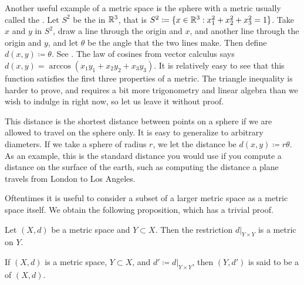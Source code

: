 \begin{example}
Another useful example of a metric space is the sphere
with a metric usually called the \emph{}.
Let $S^2$ be the  in ${\mathbb{R}}^3$,
that is $S^2 \coloneqq \{ x \in {\mathbb{R}}^3 : x_1^2+x_2^2+x_3^2 = 1 \}$.
Take $x$ and $y$ in $S^2$, draw a line through the origin and $x$,
and another line through the origin and $y$,
and let $\theta$ be the angle that the two lines make.
Then define $d(x,y) \coloneqq \theta$.  See .
The law of cosines from vector calculus says
$d(x,y) = \arccos(x_1y_1+x_2y_2+x_3y_3)$.
It is relatively easy to see that this function satisfies the first three
properties of a metric.
The triangle inequality is harder to prove, and requires a bit more
trigonometry and linear algebra than we wish to indulge in right now, so let
us leave it without proof.

\begin{myfigureht}
\caption{The great circle distance on the unit
sphere.\label{fig:spheremetric}}
\end{myfigureht}

This distance is the shortest distance between points on a sphere if
we are allowed to travel on the sphere only.  It is easy to
generalize to arbitrary diameters.  If we take a sphere of radius
$r$, we let the distance be $d(x,y) \coloneqq r \theta$.  As an example, this is the
standard distance you would use if you compute a distance on the
surface of the earth, such as computing the distance a plane travels from London to
Los Angeles.
\end{example}

Oftentimes it is useful to consider a subset of a larger metric space
as a metric space itself.  We obtain the following proposition, which has
a trivial proof.

\begin{prop}
Let $(X,d)$ be a metric space and $Y \subset X$.  Then the restriction
$d|_{Y \times Y}$ is a metric on $Y$.
\end{prop}

\begin{defn}
If $(X,d)$ is a metric space, $Y \subset X$, and $d' \coloneqq d|_{Y \times Y}$,
then $(Y,d')$ is said to be a \emph{} of $(X,d)$.
\end{defn}

